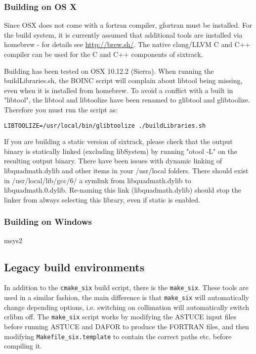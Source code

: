 \documentclass[english]{article}
\begin{document}
\subsubsection{Building on OS X}

Since OSX does not come with a fortran compiler, gfortran must be installed.
For the build system, it is currently assumed that additional tools are installed via homebrew - for details see \url{http://brew.sh/}.
The native clang/LLVM C and C++ compiler can be used for the C and C++ components of sixtrack.

Building has been tested on OSX 10.12.2 (Sierra).
When running the buildLibraries.sh, the BOINC script will complain about libtool being missing, even when it is installed from homebrew.
To avoid a conflict with a built in "libtool", the libtool and libtoolize have been renamed to glibtool and glibtoolize.
Therefore you must run the script as:
\begin{verbatim}
LIBTOOLIZE=/usr/local/bin/glibtoolize ./buildLibraries.sh
\end{verbatim}

If you are building a static version of sixtrack, please check that the output binary is statically linked (excluding libSystem) by running "otool -L" on the resulting output binary.
There have been issues with dynamic linking of libquadmath.dylib and other items in your /usr/local folders.
There should exist in /usr/local/lib/gcc/6/ a symlink from libquadmath.dylib to libquadmath.0.dylib.
Re-naming this link (libquadmath.dylib) should stop the linker from always selecting this library, even if static is enabled.

\subsubsection{Building on Windows}

msys2

\subsection{Legacy build environments}

In addition to the \texttt{cmake\_six} build script, there is the \texttt{make\_six}.
These tools are used in a similar fashion, the main difference is that \texttt{make\_six} will automatically change depending options, i.e. switching on collimation will automatically switch crlibm off.
The \texttt{make\_six} script works by modifying the ASTUCE input files before running ASTUCE and DAFOR to produce the FORTRAN files, and then modifying \texttt{Makefile\_six.template} to contain the correct paths etc. before compiling it.
\end{document}
